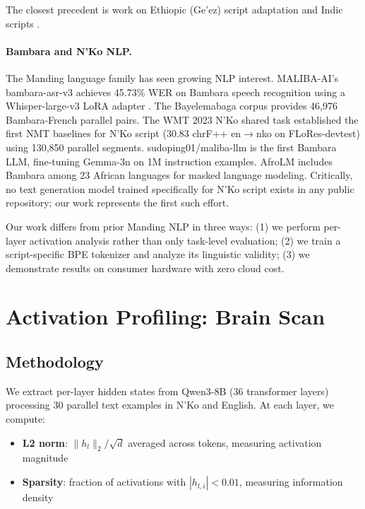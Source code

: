 \documentclass[11pt]{article}
\begin{document}
The closest precedent is work on Ethiopic (Ge'ez) script adaptation \cite{tonja2023natural} and Indic scripts \cite{kakwani2020indicnlpsuite}.

\paragraph{Bambara and N'Ko NLP.}
The Manding language family has seen growing NLP interest.
MALIBA-AI's bambara-asr-v3 achieves 45.73\% WER on Bambara speech recognition using a Whisper-large-v3 LoRA adapter \cite{maliba2024bambara}.
The Bayelemabaga corpus \cite{bayelemabaga2025} provides 46,976 Bambara-French parallel pairs.
The WMT 2023 N'Ko shared task \cite{wmt2023nko} established the first NMT baselines for N'Ko script (30.83 chrF++ en$\to$nko on FLoRes-devtest) using 130,850 parallel segments.
sudoping01/maliba-llm is the first Bambara LLM, fine-tuning Gemma-3n on 1M instruction examples.
AfroLM \cite{dossou2022afrolm} includes Bambara among 23 African languages for masked language modeling.
Critically, no text generation model trained specifically for N'Ko script exists in any public repository; our work represents the first such effort.

Our work differs from prior Manding NLP in three ways: (1) we perform per-layer activation analysis rather than only task-level evaluation; (2) we train a script-specific BPE tokenizer and analyze its linguistic validity; (3) we demonstrate results on consumer hardware with zero cloud cost.

\section{Activation Profiling: Brain Scan}
\label{sec:brain-scan}

\subsection{Methodology}

We extract per-layer hidden states from Qwen3-8B (36 transformer layers) processing 30 parallel text examples in N'Ko and English.
At each layer, we compute:

\begin{itemize}
\item \textbf{L2 norm}: $\|h_l\|_2 / \sqrt{d}$ averaged across tokens, measuring activation magnitude
\item \textbf{Sparsity}: fraction of activations with $|h_{l,i}| < 0.01$, measuring information density
\end{itemize}
\end{document}
